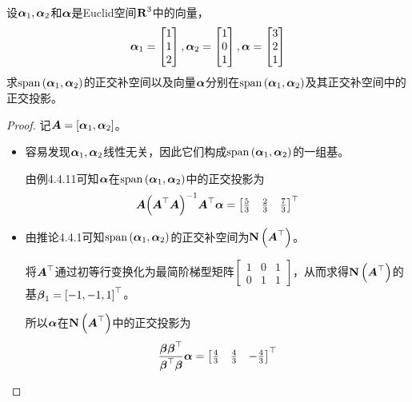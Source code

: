 \begin{problem}
设\(\boldsymbol{\alpha}_1,\boldsymbol{\alpha}_2\)和\(\boldsymbol{\alpha}\)是Euclid空间\(\boldsymbol{\mathrm{R}}^3\)中的向量，
\begin{equation*}
    \boldsymbol{\alpha}_1=\begin{bmatrix}1\\1\\2\end{bmatrix},
    \boldsymbol{\alpha}_2=\begin{bmatrix}1\\0\\1\end{bmatrix},
    \boldsymbol{\alpha}=\begin{bmatrix}3\\2\\1\end{bmatrix}
\end{equation*}
求\(\mathrm{span}\left( \boldsymbol{\alpha}_1,\boldsymbol{\alpha}_2 \right)\)的正交补空间以及向量\(\boldsymbol{\alpha}\)分别在\(\mathrm{span}\left( \boldsymbol{\alpha}_1,\boldsymbol{\alpha}_2 \right)\)及其正交补空间中的正交投影。
\end{problem}
\begin{proof}
    记\(\boldsymbol{A}=\left[ \boldsymbol{\alpha}_1,\boldsymbol{\alpha}_2 \right]\)。
    \begin{itemize}
        \item {
              容易发现\(\boldsymbol{\alpha}_1,\boldsymbol{\alpha}_2\)线性无关，因此它们构成\(\mathrm{span}\left( \boldsymbol{\alpha}_1,\boldsymbol{\alpha}_2 \right)\)的一组基。

              由例4.4.11可知\(\boldsymbol{\alpha}\)在\(\mathrm{span}\left( \boldsymbol{\alpha}_1,\boldsymbol{\alpha}_2 \right)\)中的正交投影为
              \begin{equation*}
                  \boldsymbol{A}{\left( \boldsymbol{A}^\top\boldsymbol{A} \right)}^{-1}\boldsymbol{A}^\top\boldsymbol{\alpha}=\begin{bmatrix}\frac{5}{3}&\frac{2}{3}&\frac{7}{3}\end{bmatrix}^\top
              \end{equation*}
              }
        \item {
              由推论4.4.1可知\(\mathrm{span}\left( \boldsymbol{\alpha}_1,\boldsymbol{\alpha}_2 \right)\)的正交补空间为\(\boldsymbol{\mathrm{N}}\left( \boldsymbol{A}^\top \right)\)。

              将\(\boldsymbol{A}^\top\)通过初等行变换化为最简阶梯型矩阵\(\begin{bmatrix}1 & 0 & 1 \\0 & 1 & 1\end{bmatrix}\)，从而求得\(\boldsymbol{\mathrm{N}}\left( \boldsymbol{A}^\top \right)\)的基\(\boldsymbol{\beta}_1=\left[ -1,-1,1 \right]^\top\)。

              所以\(\boldsymbol{\alpha}\)在\(\boldsymbol{\mathrm{N}}\left( \boldsymbol{A}^\top \right)\)中的正交投影为
              \begin{equation*}
                  \frac{\boldsymbol{\beta}\boldsymbol{\beta}^\top}{\boldsymbol{\beta}^\top\boldsymbol{\beta}}\boldsymbol{\alpha}=\begin{bmatrix}\frac{4}{3}&\frac{4}{3}&-\frac{4}{3}\end{bmatrix}^\top
              \end{equation*}
              }
    \end{itemize}
\end{proof}


